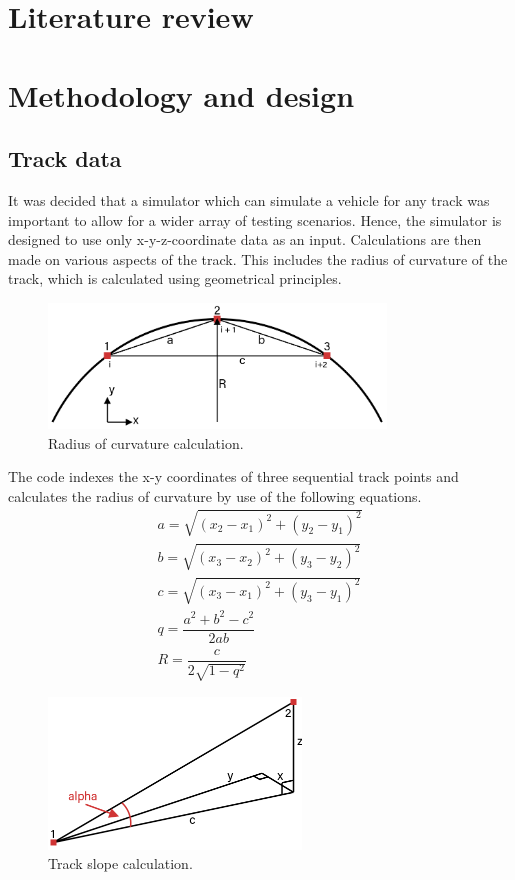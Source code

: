 \documentclass[11pt]{article}
\numberwithin{equation}{section}
\begin{document}
\section{Literature review}
\section{Methodology and design}
\subsection{Track data}
It was decided that a simulator which can simulate a vehicle for any track was important to allow for a wider array of testing scenarios. Hence, the simulator is designed to use only x-y-z-coordinate data as an input. Calculations are then made on various aspects of the track. This includes the radius of curvature of the track, which is calculated using geometrical principles.
\begin{figure}[H]
    \centering
    \includegraphics[width = 0.8\textwidth]{./img/radiusOfCurvature.png}
    \caption{Radius of curvature calculation.}
\end{figure}
The code indexes the x-y coordinates of three sequential track points and calculates the radius of curvature by use of the following equations.
\begin{gather}
    a = \sqrt{\left(x_2 - x_1\right)^2 + \left(y_2 - y_1\right)^2}\\
    b = \sqrt{\left(x_3 - x_2\right)^2 + \left(y_3 - y_2\right)^2}\\
    c = \sqrt{\left(x_3 - x_1\right)^2 + \left(y_3 - y_1\right)^2}\\
    q = \dfrac{a^2 + b^2 - c^2}{2ab}\\
    R = \dfrac{c}{2\sqrt{1 - q^2}}
\end{gather}
\begin{figure}[H]
    \centering
    \includegraphics[width = 0.6\textwidth]{./img/trackSlope.png}
    \caption{Track slope calculation.}
\end{figure}
\end{document}
